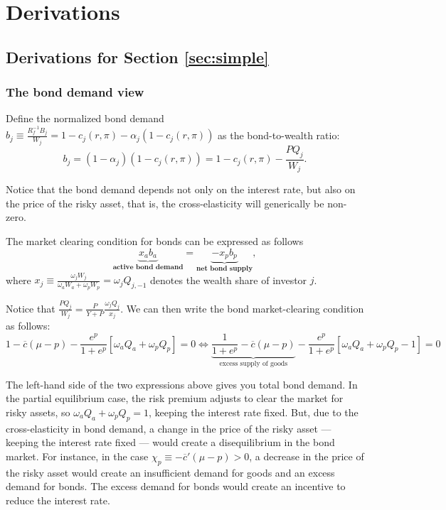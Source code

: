 \section{Derivations}
\subsection{Derivations for Section \ref{sec:simple}}
\subsubsection{The bond demand view}

Define the normalized bond demand $b_{j} \equiv \frac{R_f^{-1} B_j}{W_j} = 1 -c_{j}(r,\pi) - \alpha_j (1-c_{j}(r,\pi))$ as the bond-to-wealth ratio:
\begin{equation}
    b_j = (1-\alpha_j) (1-c_j(r,\pi)) = 1-c_{j}(r,\pi) - \frac{P Q_j}{W_j}.
\end{equation}

Notice that the bond demand depends not only on the interest rate, but also on the price of the risky asset, that is, the cross-elasticity will generically be non-zero.

The market clearing condition for bonds can be expressed as follows
\begin{equation}
    \underbrace{x_a b_a}_{\textbf{active bond demand}} = \underbrace{- x_p b_p}_{\textbf{net bond supply}},
\end{equation}
where $x_j \equiv \frac{\omega_j W_{j}}{\omega_a W_a + \omega_p W_p} = \omega_j Q_{j,-1} $ denotes the wealth share of investor $j$.

Notice that $\frac{P Q_j}{W_j} = \frac{P}{Y+P} \frac{\omega_j Q_j}{x_j}$. 
We can then write the bond market-clearing condition as follows:
\begin{equation}
    1 - \overline{c}(\mu-p) -\frac{e^p}{1+e^p} \left[\omega_a Q_a + \omega_p Q_p\right] = 0 \iff
    \underbrace{\frac{1}{1+e^p} - \overline{c}(\mu-p)}_{\text{excess supply of goods}} -\frac{e^p}{1+e^p} \left[\omega_a Q_a + \omega_p Q_p-1\right] = 0
\end{equation}

The left-hand side of the two expressions above gives you total bond demand. 
In the partial equilibrium case, the risk premium adjusts to clear the market for risky assets, so $\omega_a Q_a + \omega_p Q_p=1$, keeping the interest rate fixed.
But, due to the cross-elasticity in bond demand, a change in the price of the risky asset --- keeping the interest rate fixed --- would create a disequilibrium in the bond market.
For instance, in the case $\chi_p \equiv - \overline{c}'(\mu-p) > 0$, a decrease in the price of the risky asset would create an insufficient demand for goods and an excess demand for bonds.
The excess demand for bonds would create an incentive to reduce the interest rate.

